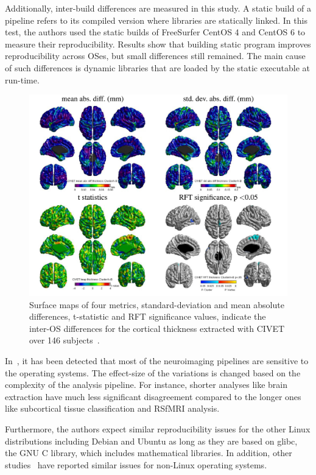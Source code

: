 Additionally, inter-build differences are measured in this study. A 
static build of a pipeline refers to its compiled version where 
libraries are statically linked. In this test, the authors used the 
static builds of FreeSurfer CentOS 4 and CentOS 6 to measure their 
reproducibility. Results show that building static program improves 
reproducibility across OSes, but small differences still remained. The 
main cause of such differences is dynamic libraries that are loaded by 
the static executable at run-time. 

\begin{figure}[H]
\centering
	\includegraphics[scale=0.9]{chapters/background/images/inter-os-diff} 
	\caption{Surface maps of four metrics, standard-deviation and mean 
	absolute differences, t-statistic and RFT significance values, 
	indicate the inter-OS differences for the cortical thickness 
	extracted with CIVET over 146 subjects~\cite{Glatard2015}. } 
	\label{inter_os}
\end{figure}
 

In~\cite{Glatard2015}, it has been detected that most of the 
neuroimaging pipelines are sensitive to the operating 
systems. The effect-size of the variations is changed based on the 
complexity of the analysis pipeline. For instance, shorter analyses 
like brain extraction have much less significant disagreement compared 
to the longer ones like subcortical tissue classification and RSfMRI 
analysis.

Furthermore, the authors expect similar reproducibility issues for the 
other Linux distributions including Debian and Ubuntu as long as they 
are based on glibc, the GNU C library, which includes mathematical 
libraries. In addition, other studies~\cite{Gronenschild2012, 
Krefting2011} have reported similar issues for non-Linux operating 
systems. 


